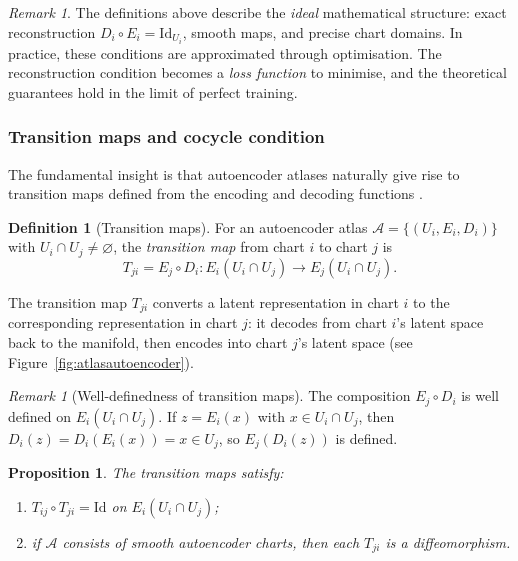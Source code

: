 \documentclass[11pt]{article}
\theoremstyle{plain}
\newtheorem{proposition}[theorem]{Proposition}
\theoremstyle{definition}
\newtheorem{definition}[theorem]{Definition}
\theoremstyle{remark}
\newtheorem{remark}[theorem]{Remark}
\begin{document}
\begin{remark}\label{rem:idealization}
The definitions above describe the \emph{ideal} mathematical structure: exact reconstruction $D_i \circ E_i = \mathrm{Id}_{U_i}$, smooth maps, and precise chart domains. In practice, these conditions are approximated through optimisation. The reconstruction condition becomes a \emph{loss function} to minimise, and the theoretical guarantees hold in the limit of perfect training.
\end{remark}

\subsubsection{Transition maps and cocycle condition}

The fundamental insight is that autoencoder atlases naturally give rise to transition maps defined from the encoding and decoding functions \cite{schonsheck2020chartautoencodersmanifoldstructured}.

\begin{definition}[Transition maps]
For an autoencoder atlas $\mathcal{A} = \{(U_i, E_i, D_i)\}$ with $U_i \cap U_j \neq \varnothing$, the \emph{transition map} from chart $i$ to chart $j$ is
\[
T_{ji} = E_j \circ D_i \colon E_i(U_i \cap U_j) \to E_j(U_i \cap U_j).
\]
\end{definition}

The transition map $T_{ji}$ converts a latent representation in chart $i$ to the corresponding representation in chart $j$: it decodes from chart $i$'s latent space back to the manifold, then encodes into chart $j$'s latent space (see Figure~\ref{fig:atlasautoencoder}).

\begin{remark}[Well-definedness of transition maps]\label{rem:transition-well-defined}
The composition $E_j\circ D_i$ is well defined on $E_i(U_i\cap U_j)$. If $z=E_i(x)$ with $x\in U_i\cap U_j$, then $D_i(z)=D_i(E_i(x))=x\in U_j$, so $E_j(D_i(z))$ is defined.
\end{remark}

\begin{proposition}\label{prop:transition-properties}
The transition maps satisfy:
\begin{enumerate}
\item $T_{ij} \circ T_{ji} = \mathrm{Id}$ on $E_i(U_i \cap U_j)$;
\item if $\mathcal{A}$ consists of smooth autoencoder charts, then each $T_{ji}$ is a diffeomorphism.
\end{enumerate}
\end{proposition}
\end{document}
